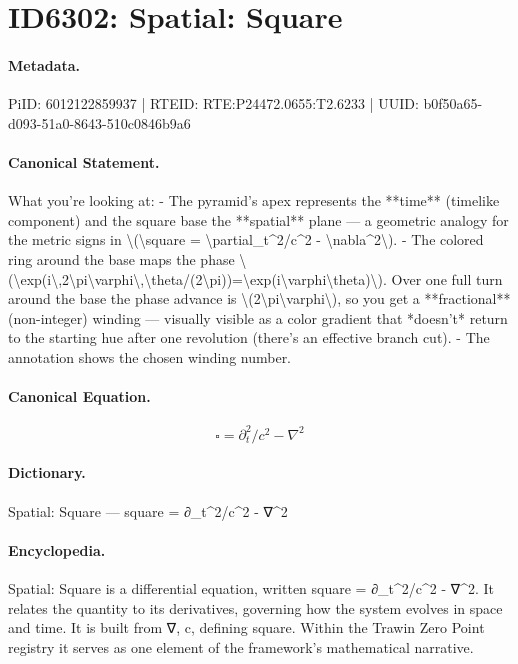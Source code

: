 \section*{ID6302: Spatial: Square}
\paragraph{Metadata.}
PiID: 6012122859937 | RTEID: RTE:P24472.0655:T2.6233 | UUID: b0f50a65-d093-51a0-8643-510c0846b9a6

\paragraph{Canonical Statement.}
What you’re looking at: - The pyramid’s apex represents the **time** (timelike component) and the square base the **spatial** plane — a geometric analogy for the metric signs in \textbackslash{}(\textbackslash{}square = \textbackslash{}partial\_t\textasciicircum{}2/c\textasciicircum{}2 - \textbackslash{}nabla\textasciicircum{}2\textbackslash{}). - The colored ring around the base maps the phase \textbackslash{}(\textbackslash{}exp(i\textbackslash{},2\textbackslash{}pi\textbackslash{}varphi\textbackslash{},\textbackslash{}theta/(2\textbackslash{}pi))=\textbackslash{}exp(i\textbackslash{}varphi\textbackslash{}theta)\textbackslash{}). Over one full turn around the base the phase advance is \textbackslash{}(2\textbackslash{}pi\textbackslash{}varphi\textbackslash{}), so you get a **fractional** (non-integer) winding — visually visible as a color gradient that *doesn’t* return to the starting hue after one revolution (there’s an effective branch cut). - The annotation shows the chosen winding number.

\paragraph{Canonical Equation.}
\[
\square = \partial_t^2/c^2 - \nabla^2
\]

\paragraph{Dictionary.}
Spatial: Square — square = ∂\_t\textasciicircum{}2/c\textasciicircum{}2 - ∇\textasciicircum{}2

\paragraph{Encyclopedia.}
Spatial: Square is a differential equation, written square = ∂\_t\textasciicircum{}2/c\textasciicircum{}2 - ∇\textasciicircum{}2. It relates the quantity to its derivatives, governing how the system evolves in space and time. It is built from ∇, c, defining square. Within the Trawin Zero Point registry it serves as one element of the framework's mathematical narrative.
